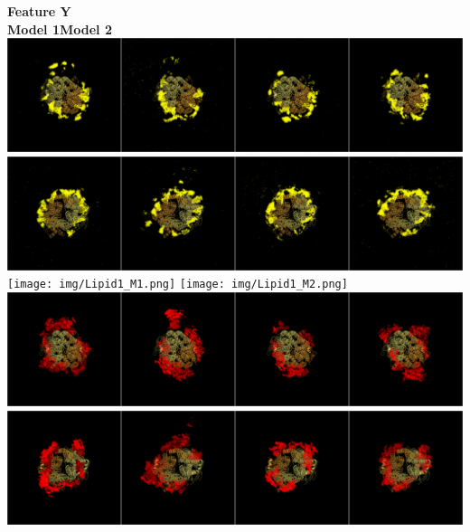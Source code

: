 \documentclass[a0,final,landscape]{a0poster}
\begin{document}
\hspace{77cm}
\begin{minipage}[c][-30cm]{0.3\textwidth}
\LARGE \textbf{Feature Y}\\
\Large\hspace{2cm}\textcolor{vino}{\textbf{Model 1}}\hspace{14 cm}\textcolor{vino}{\textbf{Model 2}}\\
\vspace{0.4cm} \includegraphics[scale=0.05]{img/Lipid0_M1.png} \hspace{1cm}
\includegraphics[scale=0.05]{img/Lipid0_M2.png} \\ \vspace{0.1cm} 
\vspace{0.4cm} \texttt{[image: img/Lipid1\_M1.png]}  \hspace{1cm} 
\texttt{[image: img/Lipid1\_M2.png]}  \\ \vspace{0.1cm} 
\vspace{0.4cm} \includegraphics[scale=0.05]{img/Lipid2_M1.png}  \hspace{1cm} 
\includegraphics[scale=0.05]{img/Lipid2_M2.png}  \\ \vspace{0.1cm}

\end{minipage}
\end{document}
